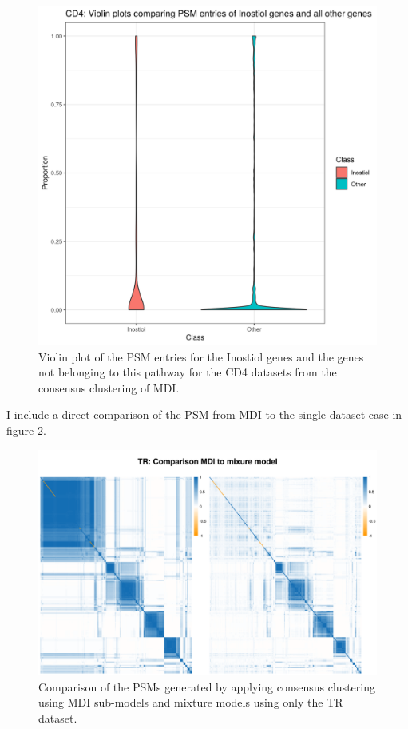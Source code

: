 \documentclass[12pt]{article} %
\begin{document}
\begin{figure}[h]
	\centering
	\includegraphics[scale=0.75]{Images/Biology_data/Set_250/All_datasets/PSM_densities/KEGG_INOSITOL_PHOSPHATE_METABOLISM/CD4.png}
	\caption{Violin plot of the PSM entries for the Inostiol genes and the genes not belonging to this pathway for the CD4 datasets from the consensus clustering of MDI.}
	\label{fig:results:cedar_1:mdi_cd4_inostiol_psm_violin}
\end{figure}
	\newpage
	
	I include a direct comparison of the PSM from MDI to the single dataset case in figure \ref{fig:results:cedar_1:mdi_mixture_model_comp_tr}.
	
	\newpage
	
	\begin{figure} %
		\centering
		\includegraphics[scale=0.75]{Images/Biology_data/Set_250/Comparison_mdi_mixture_model/TR_comparison_all_specific_sim.png}
		\caption{Comparison of the PSMs generated by applying consensus clustering using MDI sub-models and mixture models using only the TR dataset.}
		\label{fig:results:cedar_1:mdi_mixture_model_comp_tr}
	\end{figure}
	\newpage
	
\end{document}
